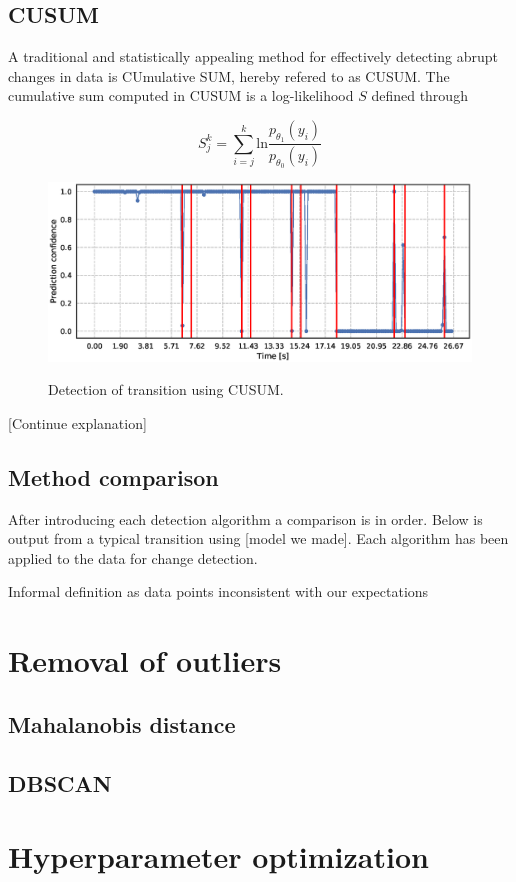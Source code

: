 \subsection{CUSUM}

A traditional and statistically appealing method for effectively detecting abrupt changes in data is CUmulative SUM, hereby refered to as CUSUM. The cumulative sum computed in CUSUM is a log-likelihood $S$ defined through

\begin{equation}
	S_j^k = \sum_{i=j}^k \text{ln}\frac{p_{\theta_1}(y_i)}{p_{\theta_0}(y_i)}
\end{equation}

\begin{figure}
	\includegraphics[scale=0.5]{figs_temp/detect_cusum}
	\label{fig:detect_cusum}
	\caption{Detection of transition using CUSUM.}
\end{figure}

[Continue explanation]






\subsection{Method comparison}

After introducing each detection algorithm a comparison is in order. Below is output from a typical transition using [model we made]. Each algorithm has been applied to the data for change detection.


Informal definition as data points inconsistent with our expectations

\section{Removal of outliers}


\subsection{Mahalanobis distance}

\subsection{DBSCAN}

\section{Hyperparameter optimization}
\fi


